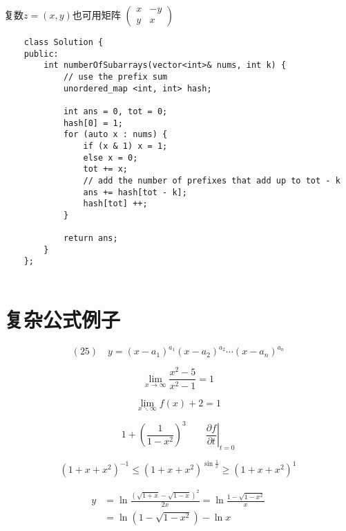 \documentclass{article}
\begin{document}
    复数$z = (x, y)$也可用矩阵 
    \begin{math}
    \left(\begin{smallmatrix}
    x & -y \\
    y & x   
    \end{smallmatrix}\right) %
    \end{math}

    \begin{verbatim}
    class Solution {
    public:
        int numberOfSubarrays(vector<int>& nums, int k) {
            // use the prefix sum
            unordered_map <int, int> hash;
             
            int ans = 0, tot = 0;
            hash[0] = 1;
            for (auto x : nums) {
                if (x & 1) x = 1;
                else x = 0;
                tot += x;
                // add the number of prefixes that add up to tot - k
                ans += hash[tot - k]; 
                hash[tot] ++;
            }
            
            return ans;
        }
    };
            
    \end{verbatim}


\section{复杂公式例子}
    \[
    (25)\quad y=\left(x-a_{1}\right)^{a_{1}}\left(x-a_{2}\right)^{a_{2}} \cdots\left(x-a_{n}\right)^{a_{n}}
    \]

    \[
    \lim _{x \rightarrow \infty} \frac{x^{2}-5}{x^{2}-1}=1
    \]

    $$\lim _{x \ddots \infty} {f(x)+ 2} = 1$$

    \[1 + \left(\frac{1}{1-x^{2}}
    \right)^3 \qquad
    \left.\frac{\partial f}{\partial t}
    \right|_{t=0}\]

    \[(1 + x + x^2)^{-1} \leqslant (1 + x + x^2)^{\sin\frac{1}{x}} \geqslant (1+x+x^2)^{1}\] %

    \[
    \begin{aligned} y &=\ln \frac{(\sqrt{1+x}-\sqrt{1-x})^{2}}{2 x}=\ln \frac{1-\sqrt{1-x^{2}}}{x} \\ &=\ln (1-\sqrt{1-x^{2}})-\ln x \end{aligned}
    \]
\end{document}
